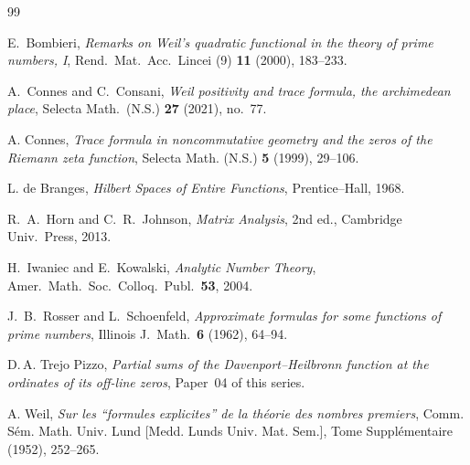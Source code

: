 \documentclass[11pt]{amsart}
\theoremstyle{definition}
\theoremstyle{remark}
\begin{document}
\begin{thebibliography}{99}

 E.~Bombieri, \emph{Remarks on Weil's quadratic
functional in the theory of prime numbers, I}, Rend.\ Mat.\ Acc.\ Lincei (9)
\textbf{11} (2000), 183--233.

 A.~Connes and C.~Consani, \emph{Weil positivity and trace
formula, the archimedean place}, Selecta Math.\ (N.S.) \textbf{27} (2021),
no.~77.

 A. Connes, \emph{Trace formula in noncommutative
geometry and the zeros of the Riemann zeta function}, Selecta Math. (N.S.)
\textbf{5} (1999), 29--106.

 L. de Branges, \emph{Hilbert Spaces of Entire
Functions}, Prentice--Hall, 1968.

 R.~A.~Horn and C.~R.~Johnson, \emph{Matrix Analysis}, 2nd ed.,
Cambridge Univ.\ Press, 2013.

 H.~Iwaniec and E.~Kowalski, \emph{Analytic Number Theory},
Amer.\ Math.\ Soc.\ Colloq.\ Publ.\ \textbf{53}, 2004.

 J.~B.~Rosser and L.~Schoenfeld, \emph{Approximate formulas for
some functions of prime numbers}, Illinois J.\ Math.\ \textbf{6} (1962),
64--94.

 D.\,A. Trejo Pizzo, \emph{Partial sums of the Davenport--Heilbronn function at the ordinates of its off-line zeros}, Paper~04 of this series.

 A. Weil, \emph{Sur les ``formules explicites'' de la
th\'eorie des nombres premiers}, Comm. S\'em. Math. Univ. Lund [Medd. Lunds
Univ. Mat. Sem.], Tome Suppl\'ementaire (1952), 252--265.

\end{thebibliography}
\end{document}
